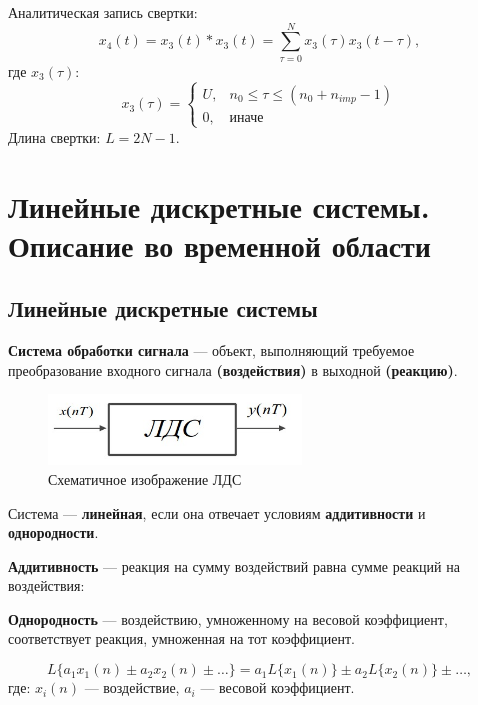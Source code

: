 \documentclass[a4paper, 14pt]{extarticle}
\begin{document}
Аналитическая запись свертки:
\begin{equation}
    x_4(t) = x_3(t) * x_3(t) = \sum\limits_{\tau = 0}^{N} x_3(\tau) x_3(t - \tau),
\end{equation}
где $x_3(\tau)$:
\begin{equation}
    x_3(\tau) = \begin{cases}
        U, & n_0 \le \tau \le (n_0 + n_{imp} - 1)\\
        0, & \text{иначе}
    \end{cases}
\end{equation}
Длина свертки: $L = 2N - 1$.


\section{Линейные дискретные системы. Описание во временной области}
\subsection{Линейные дискретные системы}\label{subsec:lds}
\textbf{Система обработки сигнала} --- объект, выполняющий требуемое преобразование входного сигнала \textbf{(воздействия)} в выходной \textbf{(реакцию)}.

\begin{figure}[h]
    \centering
    \includegraphics[width=0.6\textwidth]{img/S002.jpg}
    \caption{Схематичное изображение ЛДС}%
\end{figure}

Система --- \textbf{линейная}, если она отвечает условиям \textbf{аддитивности} и \textbf{однородности}.

\textbf{Аддитивность} --- реакция на сумму воздействий равна сумме реакций на воздействия:

\textbf{Однородность} --- воздействию, умноженному на весовой коэффициент, соответствует реакция, умноженная на тот коэффициент.

\begin{equation}
    L\{ a_1 x_1(n) \pm a_2 x_2(n) \pm \ldots \} = a_1 L\{ x_1(n)\} \pm a_2 L\{x_2(n)\} \pm \ldots,
\end{equation}
где: $x_i(n)$ --- воздействие, $a_i$ --- весовой коэффициент.
\end{document}
